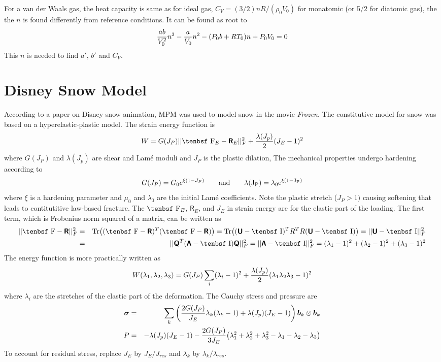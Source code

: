 \documentclass[11pt]{book}
\renewcommand{\vec}[1]{\boldsymbol{#1}}
\newcommand{\tens}[1]{\boldsymbol{\mathsf{#1}}}
\def\F{\hbox{\tenbsf F}}
\def\I{\hbox{\tenbsf I}}
\begin{document}
For a van der Waals gas, the heat capacity is same as for ideal gas, $C_V=(3/2)nR/(\rho_0 V_0)$ for monatomic (or 5/2 for diatomic gas), the the $n$ is found differently from reference conditions. It can be found as root to
\begin{equation}
     {ab\over V_0^2} n^3 - {a\over V_0} n^2 - (P_0b+RT_0)n + P_0V_0 = 0
\end{equation}
This $n$ is needed to find $a'$, $b'$ and $C_V$.

\section{Disney Snow Model\label{DSM}}

According to a paper on Disney snow animation, MPM was used to model snow in the movie {\em Frozen}. The constitutive model for snow was based on a hyperelastic-plastic model. The strain energy function is
\begin{equation}
   W=G(J_P) || \F_E - \tens R_E ||_F^2 + {\lambda(J_p)\over 2}(J_E-1)^2
\end{equation}
where $G(J_P)$ and $\lambda(J_p)$ are shear and Lam\'e moduli and $J_P$ is the plastic dilation, The mechanical properties undergo hardening according to
\begin{equation}
   G(J_P) = G_0 e^{\xi(1-J_P)} \qquad \rm and \qquad \lambda(J_P) = \lambda_0 e^{\xi(1-J_P)}
\end{equation}
where $\xi$ is a hardening parameter and $\mu_0$ and $\lambda_0$ are the initial Lam\'e coefficients. Note the plastic stretch ($J_P>1)$ causing softening that leads to contitutitive law-based fracture. The $\F_E$, $\tens R_E$, and $J_E$ in strain energy are for the elastic part of the loading. The first term, which is Frobenius norm squared of a matrix, can be written as
\begin{eqnarray}
   || \F - \tens R ||_F^2 & = & {\rm Tr}\bigl((\F - \tens R)^T(\F - \tens R)\bigr) = {\rm Tr}\bigl((\tens U - \I)^T R^TR(\tens U - \I)\bigr)
                      = || \tens U - \I ||_F^2 \\
         & = & || \tens Q^T(\tens\Lambda - \I)\tens Q ||_F^2 = || \tens\Lambda-\I ||_F^2 = (\lambda_1-1)^2 + (\lambda_2-1)^2 + (\lambda_3-1)^2 
\end{eqnarray}
The energy function is more practically written as
\begin{equation}
   W(\lambda_1,\lambda_2,\lambda_3)=G(J_P) \sum_i (\lambda_i-1)^2+ {\lambda(J_p)\over 2}(\lambda_1\lambda_2\lambda_3-1)^2
\end{equation}
where $\lambda_i$ are the stretches of the elastic part of the deformation. The Cauchy stress and pressure are
\begin{eqnarray}
   \tens\sigma & = & \sum_k  \left( {2G(J_P)\over J_E} \lambda_k(\lambda_k-1)+ \lambda(J_p)(J_E-1)\right) \vec b_k\otimes\vec b_k \\
   P & = & - \lambda(J_p)(J_E-1) - {2G(J_P)\over 3J_E} \bigl( \lambda_1^2+\lambda_2^2+\lambda_3^2-\lambda_1-\lambda_2-\lambda_3\bigr)
\end{eqnarray}
To account for residual stress, replace $J_E$ by $J_E/J_{res}$ and $\lambda_k$ by $\lambda_k/\lambda_{res}$.
\end{document}
